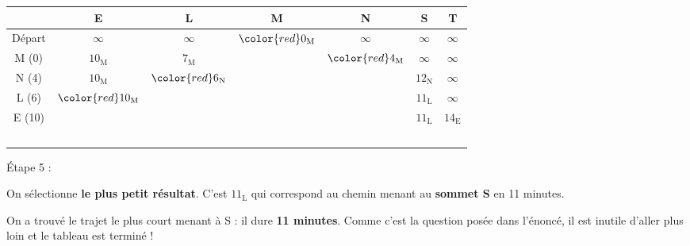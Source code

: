 \begin{center}
     \begin{extern}
          \begin{tabularx}{0.9\linewidth}{|c|C|C|C|C|C|C|}
               \hline
               \			&  E 						& L							& M							& N 							& S								& T  						\\ \hline
               Départ			&  $\infty$	 				& $\infty$					& $\color{red}0_{\text{M}}$	& $\infty$					& $\infty$						& $\infty$	  				\\ \hline
               M (0) 			&  $10_{\text{M}}$	 		& $7_{\text{M}}$	 			& 		& $\color{red}4_{\text{M}}$	& $\infty$						& $\infty$ 					\\ \hline
               N (4)			&  $10_{\text{M}}$	 		& $\color{red}6_{\text{N}}$	& \cellcolor{black!20}		& 		& $12_{\text{N}}$				& $\infty$ 					\\ \hline
               L (6)			&  $\color{red}10_{\text{M}}$	& 		& \cellcolor{black!20}		& 		& $11_{\text{L}}$				& $\infty$ 					\\ \hline
               E (10)			&  		& 		& \cellcolor{black!20}		& 		& $11_{\text{L}}$		& $14_{\text{E}}$	 		\\ \hline
               &  		& 		& 		& 		& \	& \	 		\\ \hline
          \end{tabularx}
     \end{extern}
\end{center}
\begin{h2}\'Etape 5 :\end{h2}
On sélectionne \textbf{le plus petit résultat}. C'est \og $11_{\text{L}}$ \fg{} qui correspond au chemin menant au \textbf{sommet S} en 11 minutes.
\par
On a trouvé le trajet le plus court menant à S : il dure \textbf{11 minutes}. Comme c'est la question posée dans l'énoncé, il est inutile d'aller plus loin et le tableau est terminé !
